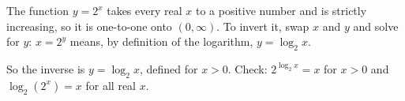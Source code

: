 The function $y=2^x$ takes every real $x$ to a positive number and is strictly increasing, so it is one-to-one onto $(0,\infty)$. To invert it, swap $x$ and $y$ and solve for $y$: $x=2^y$ means, by definition of the logarithm, $y=\log_2x$.

So the inverse is $\boxed{y=\log_2x}$, defined for $x>0$. Check: $2^{\log_2x}=x$ for $x>0$ and $\log_2\left(2^x\right)=x$ for all real $x$.
